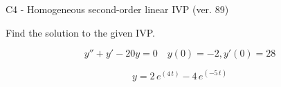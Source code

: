 \begin{exercise}
  \begin{exerciseTitle}C4 - Homogeneous second-order linear IVP (ver. 89)\end{exerciseTitle}
  \begin{exerciseStatement}
    
Find the solution to the given IVP.

    
\[y''+y'-20y = 0 \hspace{1em} y(0) = -2 , y'(0) = 28\]

  \end{exerciseStatement}
  \begin{exerciseAnswer}
    
\[y= 2 \, e^{\left(4 \, t\right)} - 4 \, e^{\left(-5 \, t\right)}\]

  \end{exerciseAnswer}
\end{exercise}